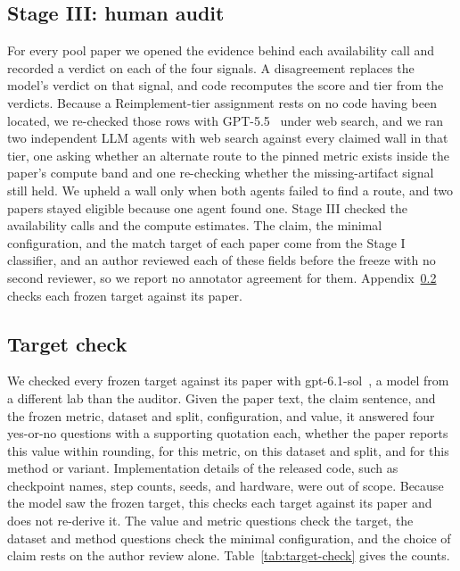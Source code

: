 \subsection{Stage III: human audit}
\label{app:human-audit}

For every pool paper we opened the evidence behind each availability call and
recorded a verdict on each of the four signals. A disagreement replaces the model's verdict on that signal, and code recomputes the score and tier from the verdicts. Because a Reimplement-tier assignment rests on no
code having been located, we re-checked those rows with
GPT-5.5~\citep{openai2026gpt55} under web search, and we ran two independent
LLM agents with web search against every claimed wall in that tier, one asking
whether an alternate route to the pinned metric exists inside the paper's
compute band and one re-checking whether the missing-artifact signal still
held. We upheld a wall only when both agents failed to find a route, and two
papers stayed eligible because one agent found one.
Stage III checked the availability calls and the compute estimates. The
claim, the minimal configuration, and the match target of each paper come from
the Stage I classifier, and an author reviewed each of these fields before the
freeze with no second reviewer, so we report no annotator agreement for them.
Appendix~\ref{app:target-check} checks each frozen target against its paper.

\subsection{Target check}
\label{app:target-check}

We checked every frozen target against its paper with gpt-6.1-sol~\citep{openai2026gpt61sol},
a model from a different lab than the auditor. Given the paper text, the
claim sentence, and the frozen metric, dataset and split, configuration, and
value, it answered four yes-or-no questions with a supporting quotation each,
whether the paper reports this value within rounding, for this metric, on this
dataset and split, and for this method or variant. Implementation details of
the released code, such as checkpoint names, step counts, seeds, and hardware,
were out of scope. Because the model saw the frozen target, this checks each
target against its paper and does not re-derive it. The value and metric
questions check the target, the dataset and method questions check the
minimal configuration, and the choice of claim rests on the author review alone.
Table~\ref{tab:target-check} gives the counts.

